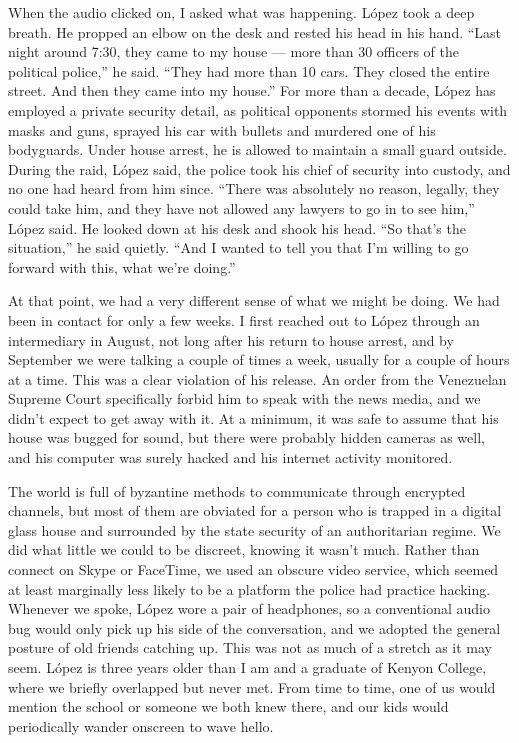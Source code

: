 When the audio clicked on, I asked what was happening. López took a deep
breath. He propped an elbow on the desk and rested his head in his hand.
``Last night around 7:30, they came to my house --- more than 30
officers of the political police,'' he said. ``They had more than 10
cars. They closed the entire street. And then they came into my house.''
For more than a decade, López has employed a private security detail, as
political opponents stormed his events with masks and guns, sprayed his
car with bullets and murdered one of his bodyguards. Under house arrest,
he is allowed to maintain a small guard outside. During the raid, López
said, the police took his chief of security into custody, and no one had
heard from him since. ``There was absolutely no reason, legally, they
could take him, and they have not allowed any lawyers to go in to see
him,'' López said. He looked down at his desk and shook his head. ``So
that's the situation,'' he said quietly. ``And I wanted to tell you that
I'm willing to go forward with this, what we're doing.''

At that point, we had a very different sense of what we might be doing.
We had been in contact for only a few weeks. I first reached out to
López through an intermediary in August, not long after his return to
house arrest, and by September we were talking a couple of times a week,
usually for a couple of hours at a time. This was a clear violation of
his release. An order from the Venezuelan Supreme Court specifically
forbid him to speak with the news media, and we didn't expect to get
away with it. At a minimum, it was safe to assume that his house was
bugged for sound, but there were probably hidden cameras as well, and
his computer was surely hacked and his internet activity monitored.

The world is full of byzantine methods to communicate through encrypted
channels, but most of them are obviated for a person who is trapped in a
digital glass house and surrounded by the state security of an
authoritarian regime. We did what little we could to be discreet,
knowing it wasn't much. Rather than connect on Skype or FaceTime, we
used an obscure video service, which seemed at least marginally less
likely to be a platform the police had practice hacking. Whenever we
spoke, López wore a pair of headphones, so a conventional audio bug
would only pick up his side of the conversation, and we adopted the
general posture of old friends catching up. This was not as much of a
stretch as it may seem. López is three years older than I am and a
graduate of Kenyon College, where we briefly overlapped but never met.
From time to time, one of us would mention the school or someone we both
knew there, and our kids would periodically wander onscreen to wave
hello.

